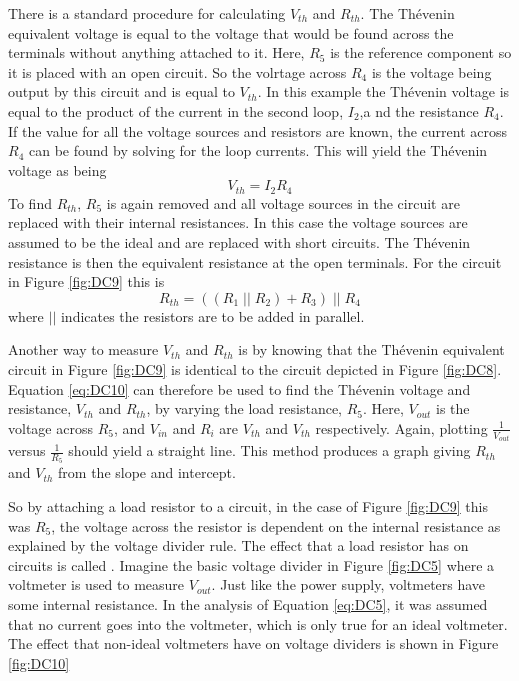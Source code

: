 There is a standard procedure for calculating $V_{th}$ and $R_{th}$. The Th\'{e}venin equivalent voltage is equal to the voltage that would be found across the terminals without anything attached to it. Here, $R_5$ is the reference component so it is placed with an open circuit. So the volrtage across $R_4$ is the voltage being output by this circuit and is equal to $V_{th}$. In this example the Th\'{e}venin voltage is equal to the product of the current in the second loop, $I_2$,a nd the resistance $R_4$. If the value for all the voltage sources and resistors are known, the current across $R_4$ can be found by solving for the loop currents. This will yield the Th\'{e}venin voltage as being \begin{equation}\label{eq:DC11}
    V_{th} = I_2R_4
\end{equation}
To find $R_{th}$, $R_5$ is again removed and all voltage sources in the circuit are replaced with their internal resistances. In this case the voltage sources are assumed to be the ideal and are replaced with short circuits. The Th\'{e}venin resistance is then the equivalent resistance at the open terminals. For the circuit in Figure \ref{fig:DC9} this is \begin{equation}\label{eq:DC12}
    R_{th} = ((R_1\;\vert\vert\;R_2)+R_3)\;\vert\vert\;R_4
\end{equation}
where $\vert\vert$ indicates the resistors are to be added in parallel.


\noindent Another way to measure $V_{th}$ and $R_{th}$ is by knowing that the Th\'{e}venin equivalent circuit in Figure \ref{fig:DC9} is identical to the circuit depicted in Figure \ref{fig:DC8}. Equation \ref{eq:DC10} can therefore be used to find the Th\'{e}venin voltage and resistance, $V_{th}$ and $R_{th}$, by varying the load resistance, $R_5$. Here, $V_{out}$ is the voltage across $R_5$, and $V_{in}$ and $R_i$ are $V_{th}$ and $V_{th}$ respectively. Again, plotting $\frac{1}{V_{out}}$ versus $\frac{1}{R_5}$ should yield a straight line. This method produces a graph giving $R_{th}$ and $V_{th}$ from the slope and intercept.


\noindent So by attaching a load resistor to a circuit, in the case of Figure \ref{fig:DC9} this was $R_5$, the voltage across the resistor is dependent on the internal resistance as explained by the voltage divider rule. The effect that a load resistor has on circuits is called . Imagine the basic voltage divider in Figure \ref{fig:DC5} where a voltmeter is used to measure $V_{out}$. Just like the power supply, voltmeters have some internal resistance. In the analysis of Equation \ref{eq:DC5}, it was assumed that no current goes into the voltmeter, which is only true for an ideal voltmeter. The effect that non-ideal voltmeters have on voltage dividers is shown in Figure \ref{fig:DC10}

